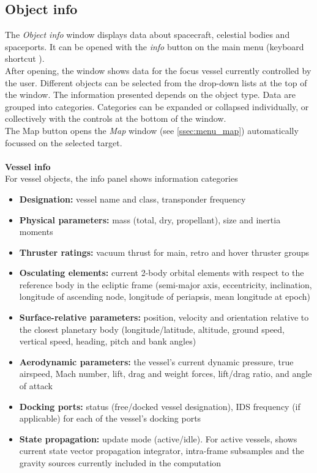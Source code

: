 \documentclass[Orbiter User Manual.tex]{subfiles}
\begin{document}
\subsection{Object info}
\label{ssec:menu_info}
The \textit{Object info} window displays data about spacecraft, celestial bodies and spaceports. It can be opened with the \textit{info} button on the main menu (keyboard shortcut \Ctrl{}).\\
After opening, the window shows data for the focus vessel currently controlled by the user. Different objects can be selected from the drop-down lists at the top of the window. The information presented depends on the object type. Data are grouped into categories. Categories can be expanded or collapsed individually, or collectively with the controls at the bottom of the window.\\
The Map button opens the \textit{Map} window (see \ref{ssec:menu_map}) automatically focussed on the selected target.\\
\\
\textbf{Vessel info}\\
For vessel objects, the info panel shows information categories

\begin{figure}[H]
	\centering
\end{figure}

\noindent
\begin{itemize}
\item \textbf{Designation:} vessel name and class, transponder frequency
\item \textbf{Physical parameters:} mass (total, dry, propellant), size and inertia moments
\item \textbf{Thruster ratings:} vacuum thrust for main, retro and hover thruster groups
\item \textbf{Osculating elements:} current 2-body orbital elements with respect to the reference body in the ecliptic frame (semi-major axis, eccentricity, inclination, longitude of ascending node, longitude of periapsis, mean longitude at epoch)
\item \textbf{Surface-relative parameters:} position, velocity and orientation relative to the closest planetary body (longitude/latitude, altitude, ground speed, vertical speed, heading, pitch and bank angles)
\item \textbf{Aerodynamic parameters:} the vessel’s current dynamic pressure, true airspeed, Mach number, lift, drag and weight forces, lift/drag ratio, and angle of attack
\item \textbf{Docking ports:} status (free/docked vessel designation), IDS frequency (if applicable) for each of the vessel’s docking ports
\item \textbf{State propagation:} update mode (active/idle). For active vessels, shows current state vector propagation integrator, intra-frame subsamples and the gravity sources currently included in the computation
\end{itemize}
\end{document}
